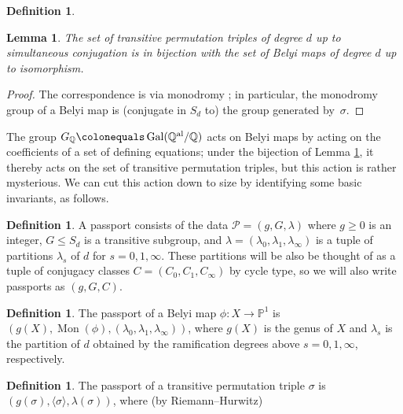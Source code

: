 \documentclass{dcthesis}
\newcommand{\PP}{\mathbb P}
\newcommand{\QQ}{\mathbb Q}
\newcommand{\defi}[1]{\textsf{#1}}
\newcommand{\QQal}{{\mathbb Q}^{\textup{al}}}
\DeclareMathOperator{\Mon}{Mon}
\DeclareMathOperator{\Gal}{Gal}
\newtheorem{lemma}[prop]{Lemma}
\theoremstyle{definition}
\newtheorem{definition}[prop]{Definition}
\theoremstyle{remark}
\numberwithin{equation}{section}
\numberwithin{figure}{section}
\begin{document}
{{{\begin{definition}
      \end{definition}
      \begin{lemma}
        \label{lem:simulisom}
        The set of transitive permutation triples of degree $d$ up to simultaneous
        conjugation is in bijection with the set of Belyi maps of degree $d$ up to
        isomorphism.
      \end{lemma}
      \begin{proof}
        The correspondence is via monodromy \cite[Lemma 1.1]{KMSV}; in particular,
        the monodromy group of a Belyi map is (conjugate in $S_d$ to) the group
        generated by~$\sigma$.
      \end{proof}
      The group $G_\QQ\colonequals\Gal(\QQal/ \QQ)$ acts on Belyi maps by acting on the
      coefficients of a set of defining equations; under the bijection of Lemma
      \ref{lem:simulisom}, it thereby acts on the set of transitive permutation
      triples, but this action is rather mysterious.
      We can cut this action down to size by identifying some basic invariants, as
      follows.
      \begin{definition}
        \label{def:passport}
        A \defi{passport} consists of the data $\mathcal{P}=(g,G,\lambda)$
        where $g \geq 0$ is an integer, $G \leq S_d$ is a transitive subgroup, and
        $\lambda=(\lambda_0,\lambda_1,\lambda_\infty)$ is a tuple of partitions
        $\lambda_s$ of $d$ for $s=0,1,\infty$.
        These partitions will be also be
        thought of as a tuple of conjugacy classes $C=(C_0,C_1,C_\infty)$ by cycle
        type, so we will also write passports as $(g,G,C)$.
      \end{definition}
      \begin{definition}
        \label{def:passportofbelyimap}
        The \defi{passport} of a
        Belyi map $\phi\colon X \to \PP^1$ is $(g(X),\Mon(\phi),
        (\lambda_0,\lambda_1,\lambda_\infty))$,
        where $g(X)$ is the genus of $X$ and
        $\lambda_s$ is the partition of $d$ obtained by the ramification degrees above
        $s=0,1,\infty$, respectively.
      \end{definition}
      \begin{definition}
        \label{def:passportofpermutationtriple}
        The \defi{passport} of a transitive
        permutation triple $\sigma$ is
        $(g(\sigma),\langle \sigma \rangle, \lambda(\sigma))$,
        where (by Riemann--Hurwitz)
        \begin{equation}\label{eqn:riemannhurwitzfortriples}

\end{equation}
\end{definition}}}}
\end{document}
